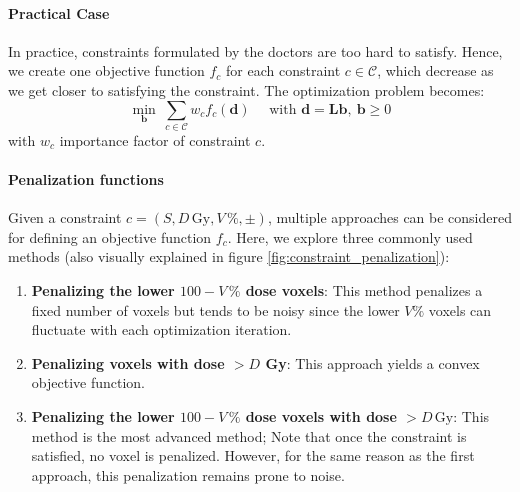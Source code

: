\paragraph{Practical Case}
In practice, constraints formulated by the doctors are too hard to satisfy.
Hence, we create one objective function $f_c$ for each constraint $c \in \mathcal{C}$, which decrease as we get closer to satisfying the constraint.
The optimization problem becomes:
$$
\min_{\mathbf{b}} \ \sum_{c \in \mathcal{C}} w_c f_c(\mathbf{d})
\quad \text{ with }
\mathbf{d} = \textbf{L}\mathbf{b}, \ \mathbf{b} \geq 0
$$
with $w_c$ importance factor of constraint $c$.

\paragraph{Penalization functions}
Given a constraint $c = \left( S, D\,\text{Gy}, V\,\%, \pm \right)$, multiple approaches can be considered for defining an objective function \( f_c \).
Here, we explore three commonly used methods (also visually explained in figure \ref{fig:constraint_penalization}):

\begin{enumerate}
	\item \textbf{Penalizing the lower $100-V\,\%$ dose voxels}:
	This method penalizes a fixed number of voxels but tends to be noisy since the lower $V\%$ voxels can fluctuate with each optimization iteration.
	\item \textbf{Penalizing voxels with dose $>D$ Gy}:
	This approach yields a convex objective function.
	\item \textbf{Penalizing the lower $100-V\,\%$ dose voxels with dose $>D\,\text{Gy}$}:
	This method is the most advanced method; 
	Note that once the constraint is satisfied, no voxel is penalized.
	However, for the same reason as the first approach, this penalization remains prone to noise.
\end{enumerate}

